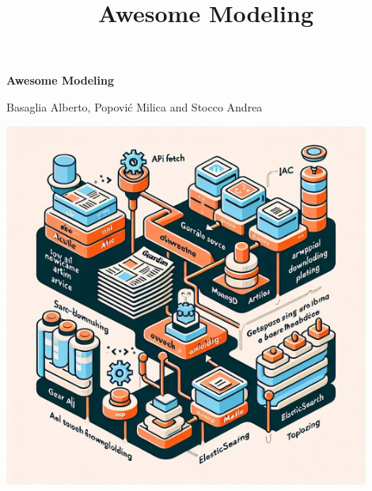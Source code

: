 \documentclass{article}
\title{Awesome Modeling}
\begin{document}
\begin{titlepage}
    \centering
    \vspace*{\fill}

    \vspace*{0.5cm}

    \huge\bfseries
        Awesome Modeling

    \vspace*{0.5cm}

    \large Basaglia Alberto, Popović Milica and Stocco Andrea

    \vspace*{2cm}

    \includegraphics[width=12cm]{front.jpeg} %

    \vspace*{\fill}
\end{titlepage}

\newpage



\clearpage
\newpage


\clearpage
\newpage


\clearpage
\newpage


\clearpage
\newpage


\clearpage
\newpage


\clearpage
\newpage




\appendix
\end{document}
